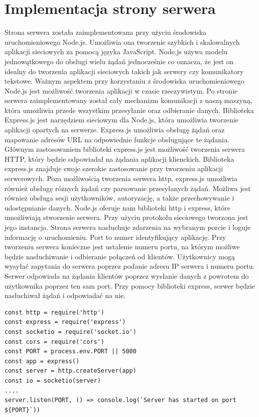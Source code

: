 \section{Implementacja strony serwera}
Strona serwera została zaimplementowana przy użyciu środowiska uruchomieniowego Node.js. Umożliwia ona tworzenie szybkich i skalowalnych aplikacji sieciowych za pomocą języka JavaScript. Node.js używa modelu jednowątkowego do obsługi wielu żądań jednocześnie co oznacza, że jest on idealny do tworzenia aplikacji sieciowych takich jak serwery czy komunikatory tekstowe. Ważnym aspektem przy korzystaniu z środowiska uruchomieniowego Node.js jest możliwość tworzenia aplikacji w czasie rzeczywistym. Po stronie serwera zaimplementowany został cały mechanizm komunikacji z naszą maszyną, która umożliwia przede wszystkim przesyłanie oraz odbieranie danych.
Biblioteka Express.js  jest narzędziem sieciowym dla Node.js, która umożliwia tworzenie aplikacji opartych na serwerze. Express.js umożliwia obsługę żądań oraz mapowanie adresów URL na odpowiednie funkcje obsługujące te żądania. Głównym zastosowaniem biblioteki express.js jest możliwość tworzenia serwera HTTP, który będzie odpowiadał na żądania aplikacji klienckich. Biblioteka express.js znajduje swoje szerokie zastosowanie przy tworzeniu aplikacji serwerowych. Poza możliwością tworzenia serwera http, express.js umożliwia również obsługę różnych żądań czy parsowanie przesyłanych żądań. Możliwa jest również obsługa sesji użytkowników, autoryzację, a także przechowywanie i udostępnianie danych.
Node.js oferuje nam biblioteki http i express, które umożliwiają stworzenie serwera. Przy użyciu protokołu sieciowego tworzona jest jego instancja. Strona serwera nasłuchuje zdarzenia na wybranym porcie i loguje informację o uruchomieniu. Port to numer identyfikujący aplikację. Przy tworzeniu serwera konieczne jest ustalenie numeru portu, na którym możliwe będzie nasłuchiwanie i odbieranie połączeń od klientów. Użytkownicy mogą wysyłać zapytania do serwera poprzez podanie adresu IP serwera i numeru portu. Serwer odpowiada na żądania klientów poprzez wysłanie danych z powrotem do użytkownika poprzez ten sam port. Przy pomocy biblioteki express, serwer będzie nasłuchiwał żądań i odpowiadać na nie. 
\begin{lstlisting}[caption=Implementacja serwera]
const http = require('http')
const express = require('express')
const socketio = require('socket.io')
const cors = require('cors')
const PORT = process.env.PORT || 5000
const app = express()
const server = http.createServer(app)
const io = socketio(server)
....
server.listen(PORT, () => console.log(`Server has started on port 
${PORT}`))
\end{lstlisting}
